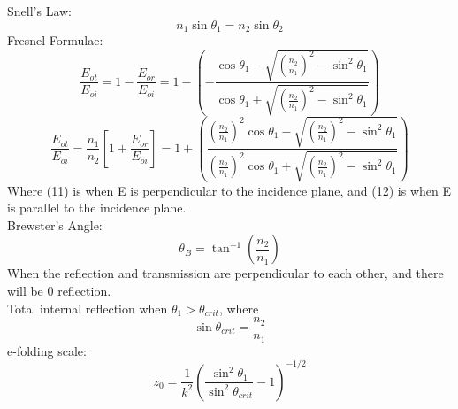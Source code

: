\documentclass[12pt]{article}
\begin{document}
Snell's Law:
\[n_1\sin\theta_1=n_2\sin\theta_2\]
Fresnel Formulae:
\begin{equation}
    \frac{E_{ot}}{E_{oi}}=1-\frac{E_{or}}{E_{oi}}=1-\left( -\frac{\cos\theta_1-\sqrt{\left(\frac{n_2}{n_1}\right)^2-\sin^2\theta_1}}{\cos\theta_1+\sqrt{\left(\frac{n_2}{n_1}\right)^2-\sin^2\theta_1}}  \right)
\end{equation}
\begin{equation}
    \frac{E_{ot}}{E_{oi}}=\frac{n_1}{n_2}\left[1+\frac{E_{or}}{E_{oi}}\right]=1+\left( \frac{\left(\frac{n_2}{n_1}\right)^2\cos\theta_1-\sqrt{\left(\frac{n_2}{n_1}\right)^2-\sin^2\theta_1}}{\left(\frac{n_2}{n_1}\right)^2\cos\theta_1+\sqrt{\left(\frac{n_2}{n_1}\right)^2-\sin^2\theta_1}}  \right)
\end{equation}
Where (11) is when E is perpendicular to the incidence plane, and (12) is when E is parallel to the incidence plane.\\
Brewster's Angle:
\[\theta_B=\tan^{-1}\left( \frac{n_2}{n_1}\right)\]
When the reflection and transmission are perpendicular to each other, and there will be 0 reflection. 
\\ Total internal reflection when $\theta_1>\theta_{crit}$, where
\[\sin\theta_{crit}=\frac{n_2}{n_1}\]
e-folding scale:
\[z_0=\frac{1}{k^2}\left(\frac{\sin^2\theta_1}{\sin^2\theta_{crit}} -1 \right)^{-1/2}\]
\end{document}
